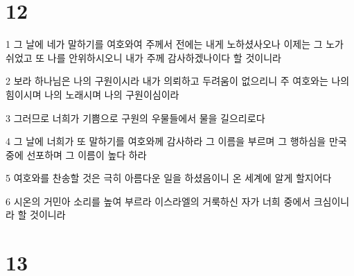 \chapter{12}

\par 1 그 날에 네가 말하기를 여호와여 주께서 전에는 내게 노하셨사오나 이제는 그 노가 쉬었고 또 나를 안위하시오니 내가 주께 감사하겠나이다 할 것이니라
\par 2 보라 하나님은 나의 구원이시라 내가 의뢰하고 두려움이 없으리니 주 여호와는 나의 힘이시며 나의 노래시며 나의 구원이심이라
\par 3 그러므로 너희가 기쁨으로 구원의 우물들에서 물을 길으리로다
\par 4 그 날에 너희가 또 말하기를 여호와께 감사하라 그 이름을 부르며 그 행하심을 만국 중에 선포하며 그 이름이 높다 하라
\par 5 여호와를 찬송할 것은 극히 아름다운 일을 하셨음이니 온 세계에 알게 할지어다
\par 6 시온의 거민아 소리를 높여 부르라 이스라엘의 거룩하신 자가 너희 중에서 크심이니라 할 것이니라

\chapter{13}

